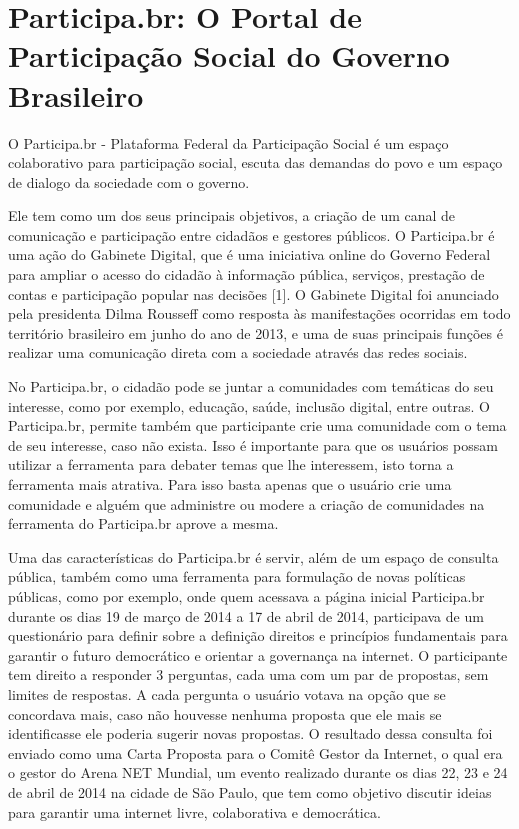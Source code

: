 \chapter{Participa.br: O Portal de Participação Social do Governo Brasileiro}
\label{cap:participabr}

O Participa.br - Plataforma Federal da Participação Social é um espaço colaborativo  para participação social, escuta das demandas do povo e um espaço de dialogo da sociedade com o governo. 

Ele tem como um dos seus principais objetivos, a criação de um canal de comunicação e participação entre cidadãos e gestores públicos. O Participa.br é uma ação do Gabinete Digital, que é uma iniciativa online do Governo Federal para ampliar o acesso do cidadão à informação pública, serviços, prestação de contas e participação popular nas decisões [1]. O Gabinete Digital foi anunciado pela presidenta Dilma Rousseff como resposta às manifestações ocorridas em todo território brasileiro em junho do ano de 2013, e uma de suas principais funções é realizar uma comunicação direta com a sociedade através das redes sociais.

No Participa.br, o cidadão pode se juntar a comunidades com temáticas do seu interesse, como por exemplo, educação, saúde, inclusão digital, entre outras. O Participa.br, permite também que participante crie uma comunidade com o tema de seu interesse, caso não exista. Isso é importante para que os usuários possam utilizar a ferramenta para debater temas que lhe interessem, isto torna a ferramenta mais atrativa. Para isso basta apenas que o usuário crie uma comunidade e alguém que administre ou modere a criação de comunidades na ferramenta do Participa.br aprove a mesma.

Uma das características do Participa.br é servir, além de um espaço de consulta pública, também como uma ferramenta para formulação de novas políticas públicas, como por exemplo, onde quem acessava a página inicial Participa.br durante os dias 19 de março de 2014 a 17 de abril de 2014, participava de um questionário para definir sobre a definição direitos e princípios fundamentais para garantir o futuro democrático e orientar a governança na internet. O participante tem direito a responder 3 perguntas, cada uma com um par de propostas, sem limites de respostas. A cada pergunta o usuário votava na opção que se concordava mais, caso não houvesse nenhuma proposta que ele mais se identificasse ele poderia sugerir novas propostas. O resultado dessa consulta foi enviado como uma Carta Proposta para o Comitê Gestor da Internet, o qual era o gestor do Arena NET Mundial, um evento realizado durante os dias 22, 23 e 24 de abril de 2014 na cidade de São Paulo, que tem como objetivo discutir ideias para garantir uma internet livre, colaborativa e democrática.

